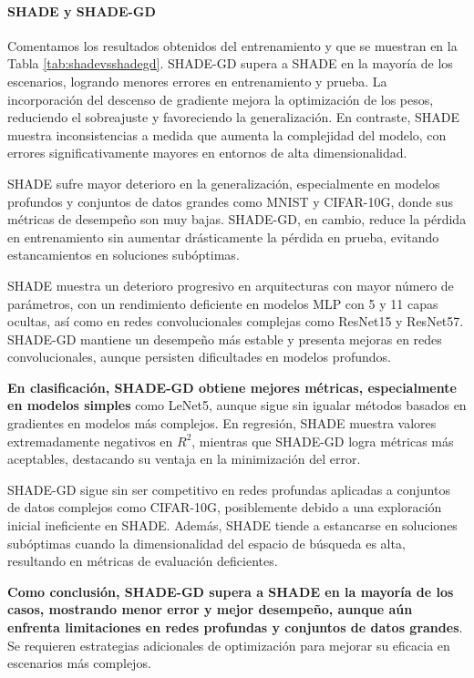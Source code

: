 \vspace{0.4cm}
\paragraph{SHADE y SHADE-GD\\}  


\mbox{}
\vspace{0.1cm}

Comentamos los resultados obtenidos del entrenamiento y que se muestran en la Tabla \ref{tab:shadevsshadegd}. SHADE-GD supera a SHADE en la mayoría de los escenarios, logrando menores errores en entrenamiento y prueba. La incorporación del descenso de gradiente mejora la optimización de los pesos, reduciendo el sobreajuste y favoreciendo la generalización. En contraste, SHADE muestra inconsistencias a medida que aumenta la complejidad del modelo, con errores significativamente mayores en entornos de alta dimensionalidad.

SHADE sufre mayor deterioro en la generalización, especialmente en modelos profundos y conjuntos de datos grandes como MNIST y CIFAR-10G, donde sus métricas de desempeño son muy bajas. SHADE-GD, en cambio, reduce la pérdida en entrenamiento sin aumentar drásticamente la pérdida en prueba, evitando estancamientos en soluciones subóptimas.

SHADE muestra un deterioro progresivo en arquitecturas con mayor número de parámetros, con un rendimiento deficiente en modelos MLP con 5 y 11 capas ocultas, así como en redes convolucionales complejas como ResNet15 y ResNet57. SHADE-GD mantiene un desempeño más estable y presenta mejoras en redes convolucionales, aunque persisten dificultades en modelos profundos.

\textbf{En clasificación, SHADE-GD obtiene mejores métricas, especialmente en modelos simples} como LeNet5, aunque sigue sin igualar métodos basados en gradientes en modelos más complejos. En regresión, SHADE muestra valores extremadamente negativos en $R^2$, mientras que SHADE-GD logra métricas más aceptables, destacando su ventaja en la minimización del error.

SHADE-GD sigue sin ser competitivo en redes profundas aplicadas a conjuntos de datos complejos como CIFAR-10G, posiblemente debido a una exploración inicial ineficiente en SHADE. Además, SHADE tiende a estancarse en soluciones subóptimas cuando la dimensionalidad del espacio de búsqueda es alta, resultando en métricas de evaluación deficientes.

\textbf{Como conclusión, SHADE-GD supera a SHADE en la mayoría de los casos, mostrando menor error y mejor desempeño, aunque aún enfrenta limitaciones en redes profundas y conjuntos de datos grandes}. Se requieren estrategias adicionales de optimización para mejorar su eficacia en escenarios más complejos.





